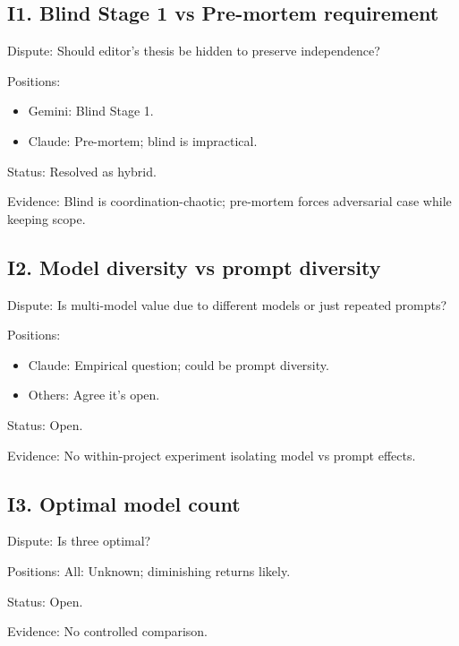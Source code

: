 \documentclass[11pt,letterpaper]{article}
\begin{document}
\subsection{I1. Blind Stage 1 vs Pre-mortem requirement}

\begin{reflist}
\item[Dispute:] Should editor's thesis be hidden to preserve independence?
\item[Positions:]~
  \begin{itemize}[nosep]
    \item Gemini: Blind Stage 1.
    \item Claude: Pre-mortem; blind is impractical.
  \end{itemize}
\item[Status:] Resolved as hybrid.
\item[Evidence:] Blind is coordination-chaotic; pre-mortem forces adversarial case while keeping scope.
\end{reflist}

\subsection{I2. Model diversity vs prompt diversity}

\begin{reflist}
\item[Dispute:] Is multi-model value due to different models or just repeated prompts?
\item[Positions:]~
  \begin{itemize}[nosep]
    \item Claude: Empirical question; could be prompt diversity.
    \item Others: Agree it's open.
  \end{itemize}
\item[Status:] Open.
\item[Evidence:] No within-project experiment isolating model vs prompt effects.
\end{reflist}

\subsection{I3. Optimal model count}

\begin{reflist}
\item[Dispute:] Is three optimal?
\item[Positions:] All: Unknown; diminishing returns likely.
\item[Status:] Open.
\item[Evidence:] No controlled comparison.
\end{reflist}
\end{document}
